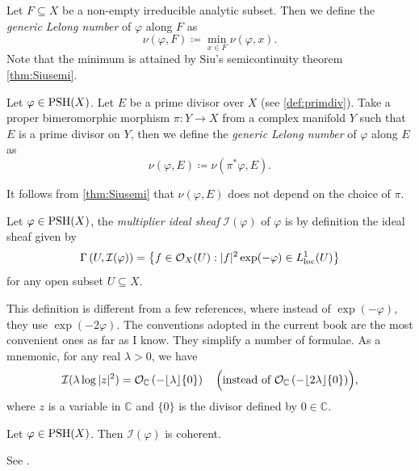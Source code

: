 \begin{definition}\label{def:pshfunctions:L1101}
    Let $F\subseteq X$ be a non-empty irreducible analytic subset. Then we define the \emph{generic Lelong number} of $\varphi$ along $F$ as
    \[
    \nu(\varphi,F)\coloneqq \min_{x\in F}\nu(\varphi,x).
    \]
    Note that the minimum is attained by Siu's semicontinuity theorem \cref{thm:Siusemi}.
\end{definition}




\begin{definition}\label{def:pshfunctions:L1112}
    Let $\varphi\in \mathrm{PSH}(X)$.
    Let $E$ be a prime divisor over $X$ (see \cref{def:primdiv}). Take a proper bimeromorphic morphism $\pi\colon Y\rightarrow X$ from a complex manifold $Y$ such that $E$ is a prime divisor on $Y$, then we define the \emph{generic Lelong number} of $\varphi$ along $E$ as
    \[
        \nu(\varphi,E)\coloneqq \nu(\pi^*\varphi,E).
    \]
\end{definition}
It follows from \cref{thm:Siusemi} that $\nu(\varphi,E)$ does not depend on the choice of $\pi$.

\begin{definition}\label{def:pshfunctions:L1122}
Let $\varphi\in \mathrm{PSH}(X)$, the \emph{multiplier ideal sheaf}  $\mathcal{I}(\varphi)$  of $\varphi$ is by definition the ideal sheaf given by
\[
\Gamma\left(U,\mathcal{I}(\varphi)\right)=\left\{ f\in \mathcal{O}_X(U) : |f|^2\exp(-\varphi)\in L^1_{\mathrm{loc}}(U) \right\}
\]
for any open subset $U\subseteq X$.
\end{definition}

\begin{remark}\label{rmk:misconv}
This definition is different from a few references, where instead of $\exp(-\varphi)$, they use $\exp(-2\varphi)$. The conventions adopted in the current book are the most convenient ones as far as I know. They simplify a number of formulae. As a mnemonic, for any real $\lambda>0$, we have
\[
\mathcal{I}(\lambda \log |z|^2)=\mathcal{O}_{\mathbb{C}}\left(-\lfloor \lambda \rfloor \{0\}\right)\quad \Bigl(\textup{instead of }\mathcal{O}_{\mathbb{C}}\left(-\lfloor 2\lambda \rfloor \{0\}\right)\Bigr),
\]
where $z$ is a variable in $\mathbb{C}$ and $\{0\}$ is the divisor defined by $0\in \mathbb{C}$.
\end{remark}

\begin{proposition}[Nadel]
    Let $\varphi\in \mathrm{PSH}(X)$. Then $\mathcal{I}(\varphi)$ is coherent.
\end{proposition}
See \cite[Proposition~5.7]{Dem12}.

